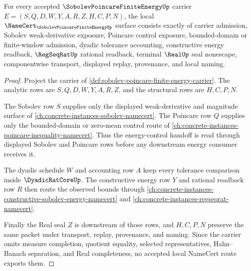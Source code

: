 \begin{theorem}
\label{thm:sobolev-poincare-finite-energy-namecert-obligations}
For every accepted $\SobolevPoincareFiniteEnergyUp$ carrier $E=(S,Q,D,W,Y,A,R,Z,H,C,P,N)$, the local $\NameCert_{\SobolevPoincareFiniteEnergyUp}$ surface consists exactly of carrier admission, Sobolev weak-derivative exposure, Poincare control exposure, bounded-domain or finite-window admission, dyadic tolerance accounting, constructive energy readback, $\RegSeqRatUp$ rational readback, terminal $\RealUp$ seal nonescape, componentwise transport, displayed replay, provenance, and local naming.
\end{theorem}
\begin{proof}
Project the carrier of \autoref{def:sobolev-poincare-finite-energy-carrier}. The analytic rows are $S,Q,D,W,Y,A,R,Z$, and the structural rows are $H,C,P,N$.

The Sobolev row $S$ supplies only the displayed weak-derivative and magnitude surface of \autoref{ch:concrete-instances-sobolev-namecert}. The Poincare row $Q$ supplies only the bounded-domain or zero-mean control route of \autoref{ch:concrete-instances-poincare-inequality-namecert}. Thus the energy-control handoff is read through displayed Sobolev and Poincare rows before any downstream energy consumer receives it.

The dyadic schedule $W$ and accounting row $A$ keep every tolerance comparison inside $\DyadicRatCoreUp$. The constructive energy row $Y$ and rational readback row $R$ then route the observed bounds through \autoref{ch:concrete-instances-constructive-sobolev-energy-namecert} and \autoref{ch:concrete-instances-regseqrat-namecert}.

Finally the Real seal $Z$ is downstream of those rows, and $H,C,P,N$ preserve the same packet under transport, replay, provenance, and naming. Since the carrier omits measure completion, quotient equality, selected representatives, Hahn--Banach separation, and Real completeness, no accepted local NameCert route exports them.
\end{proof}

